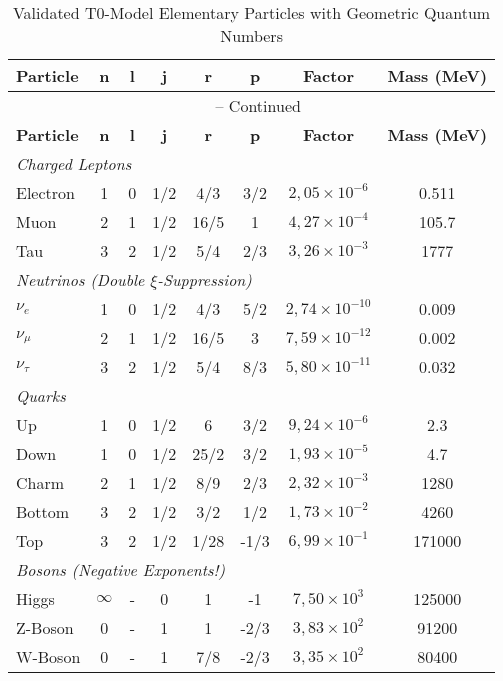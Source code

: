 \documentclass[12pt,a4paper]{article}
\theoremstyle{definition}
\begin{document}
	\begin{longtable}{lccccccc}
		\caption{Validated T0-Model Elementary Particles with Geometric Quantum Numbers} \\
		\toprule
		\textbf{Particle} & \textbf{n} & \textbf{l} & \textbf{j} & \textbf{r} & \textbf{p} & \textbf{Factor} & \textbf{Mass (MeV)} \\
		\midrule
		\endfirsthead
		\multicolumn{8}{c}{\tablename\ \thetable{} -- Continued} \\
		\toprule
		\textbf{Particle} & \textbf{n} & \textbf{l} & \textbf{j} & \textbf{r} & \textbf{p} & \textbf{Factor} & \textbf{Mass (MeV)} \\
		\midrule
		\endhead
		\multicolumn{8}{l}{\emph{Charged Leptons}} \\
		Electron & 1 & 0 & 1/2 & 4/3 & 3/2 & $2{,}05 \times 10^{-6}$ & 0.511 \\
		Muon & 2 & 1 & 1/2 & 16/5 & 1 & $4{,}27 \times 10^{-4}$ & 105.7 \\
		Tau & 3 & 2 & 1/2 & 5/4 & 2/3 & $3{,}26 \times 10^{-3}$ & 1777 \\
		\midrule
		\multicolumn{8}{l}{\emph{Neutrinos (Double $\xi$-Suppression)}} \\
		$\nu_e$ & 1 & 0 & 1/2 & 4/3 & 5/2 & $2{,}74 \times 10^{-10}$ & 0.009 \\
		$\nu_\mu$ & 2 & 1 & 1/2 & 16/5 & 3 & $7{,}59 \times 10^{-12}$ & 0.002 \\
		$\nu_\tau$ & 3 & 2 & 1/2 & 5/4 & 8/3 & $5{,}80 \times 10^{-11}$ & 0.032 \\
		\midrule
		\multicolumn{8}{l}{\emph{Quarks}} \\
		Up & 1 & 0 & 1/2 & 6 & 3/2 & $9{,}24 \times 10^{-6}$ & 2.3 \\
		Down & 1 & 0 & 1/2 & 25/2 & 3/2 & $1{,}93 \times 10^{-5}$ & 4.7 \\
		Charm & 2 & 1 & 1/2 & 8/9 & 2/3 & $2{,}32 \times 10^{-3}$ & 1280 \\
		Bottom & 3 & 2 & 1/2 & 3/2 & 1/2 & $1{,}73 \times 10^{-2}$ & 4260 \\
		Top & 3 & 2 & 1/2 & 1/28 & -1/3 & $6{,}99 \times 10^{-1}$ & 171000 \\
		\midrule
		\multicolumn{8}{l}{\emph{Bosons (Negative Exponents!)}} \\
		Higgs & $\infty$ & - & 0 & 1 & -1 & $7{,}50 \times 10^{3}$ & 125000 \\
		Z-Boson & 0 & - & 1 & 1 & -2/3 & $3{,}83 \times 10^{2}$ & 91200 \\
		W-Boson & 0 & - & 1 & 7/8 & -2/3 & $3{,}35 \times 10^{2}$ & 80400 \\
		\bottomrule
	\end{longtable}
	
\end{document}
